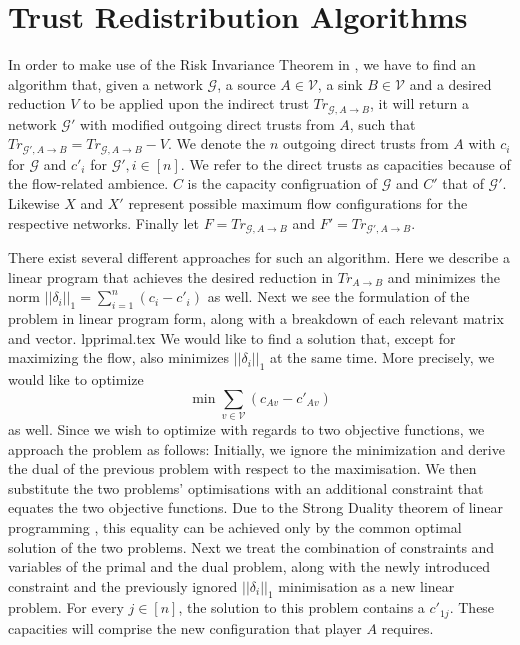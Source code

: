 \section{Trust Redistribution Algorithms} \label{riskinvalgs}
  In order to make use of the Risk Invariance Theorem in \cite{trustisrisk}, we have to find an algorithm that, given a
  network $\mathcal{G}$, a source $A \in \mathcal{V}$, a sink $B \in \mathcal{V}$ and a desired reduction $V$ to be applied
  upon the indirect trust $Tr_{\mathcal{G}, A \rightarrow B}$, it will return a network $\mathcal{G}'$ with modified outgoing
  direct trusts from $A$, such that $Tr_{\mathcal{G}', A \rightarrow B} = Tr_{\mathcal{G}, A \rightarrow B} - V$. We denote
  the $n$ outgoing direct trusts from $A$ with $c_i$ for $\mathcal{G}$ and $c'_i$ for $\mathcal{G}', i \in \left[n\right]$. We
  refer to the direct trusts as capacities because of the flow-related ambience. $C$ is the capacity configruation of
  $\mathcal{G}$ and $C'$ that of $\mathcal{G}'$. Likewise $X$ and $X'$ represent possible maximum flow configurations for the
  respective networks. Finally let $F = Tr_{\mathcal{G}, A \rightarrow B}$ and $F' = Tr_{\mathcal{G}', A \rightarrow B}$.

  There exist several different approaches for such an algorithm. Here we describe a linear program that achieves the desired
  reduction in $Tr_{A \rightarrow B}$ and minimizes the norm $||\delta_i||_1 = \sum\limits_{i=1}^{n}\left(c_i-c'_i\right)$ as
  well. Next we see the formulation of the problem in linear program form, along with a breakdown of each relevant matrix and
  vector.
  {lpprimal.tex}
  We would like to find a solution that, except for maximizing the flow, also minimizes $||\delta_i||_1$ at the same time.
  More precisely, we would like to optimize
  \begin{equation*}
    \min{\sum\limits_{v \in \mathcal{V}}\left(c_{Av} - c'_{Av}\right)}
  \end{equation*}
  as well.
  Since we wish to optimize with regards to two objective functions, we approach the problem as follows: Initially, we ignore
  the minimization and derive the dual of the previous problem with respect to the maximisation. We then substitute the two
  problems' optimisations with an additional constraint that equates the two objective functions. Due to the Strong Duality
  theorem of linear programming \cite{amo}, this equality can be achieved only by the common optimal solution of the
  two problems. Next we treat the combination of constraints and variables of the primal and the dual problem, along with the
  newly introduced constraint and the previously ignored $||\delta_i||_1$ minimisation as a new linear problem. For every
  $j \in \left[n\right]$, the solution to this problem contains a $c'_{1j}$. These capacities will comprise the new
  configuration that player $A$ requires.

